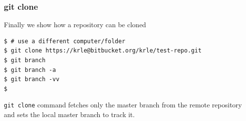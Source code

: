 \documentclass{beamer}
\begin{document}













\begin{frame}[fragile]
\frametitle{git clone}

Finally we show how a repository can be cloned

\begin{lstlisting}
$ # use a different computer/folder
$ git clone https://krle@bitbucket.org/krle/test-repo.git
$ git branch
$ git branch -a
$ git branch -vv
$ 
\end{lstlisting}

\texttt{git clone} command fetches only the master branch from the remote
repository and sets the local master branch to track it.

\end{frame}
\end{document}
